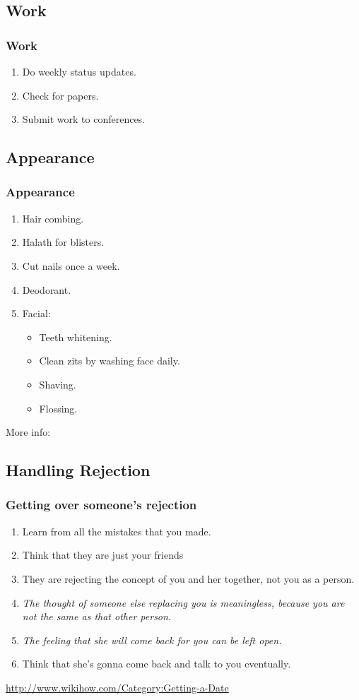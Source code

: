 \subsection{Work}
\begin{frame} 
\frametitle{Work}
\begin{enumerate} 
\item \tiny Do weekly status updates. 
\item \tiny Check for papers. 
\item \tiny Submit work to conferences. 
\end{enumerate} 
\end{frame} 

\subsection{Appearance}
\begin{frame} 
\frametitle{Appearance}
\begin{enumerate} 
\item \tiny Hair combing.
\item \tiny Halath for blisters.
\item \tiny Cut nails once a week.
\item \tiny Deodorant.
\item \tiny Facial: 
\begin{itemize}
\item Teeth whitening.
\item Clean zits by washing face daily.
\item Shaving.  
\item Flossing.
\end{itemize}
\end{enumerate}  

More info: \url{  } 

\end{frame} 


\subsection{Handling Rejection}
\begin{frame}
\frametitle{Getting over someone's rejection}
\begin{enumerate}
\item \tiny  Learn from all  the mistakes that you made. 
\item \tiny  Think that they are just your friends
\item \tiny  They are rejecting the concept of you and her together, not you as a person. 
\item \tiny \textit{ The thought of someone else replacing you is meaningless, because you are not the same as that other person}. 
\item \tiny \textit{The feeling that she will come back for you can be left open.} 
\item \tiny Think that she's gonna come back and talk to you eventually.  
\end{enumerate}
\item \small \url{ http://www.wikihow.com/Category:Getting-a-Date}
\end{frame}
